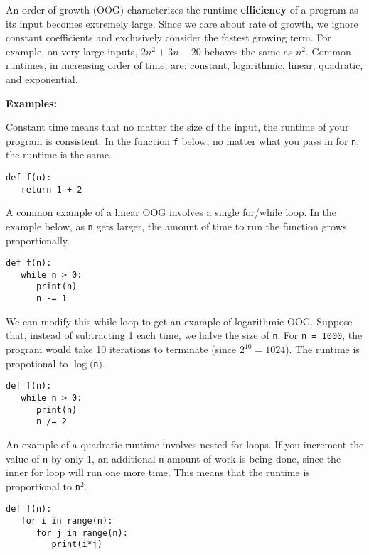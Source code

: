 An order of growth (OOG) characterizes the runtime \textbf{efficiency} of a program as its input becomes extremely large. Since we care about rate of growth, we ignore constant coefficients and exclusively consider the fastest growing term. For example, on very large inputs, $2n^2 + 3n - 20$ behaves the same as $n^2$. Common runtimes, in increasing order of time, are: constant, logarithmic, linear, quadratic, and exponential.

\textbf{Examples:}

Constant time means that no matter the size of the input, the runtime of your program is consistent. In the function \lstinline{f} below, no matter what you pass in for \lstinline{n}, the runtime is the same. \\
\begin{lstlisting}
def f(n):
   return 1 + 2
\end{lstlisting}
A common example of a linear OOG involves a single for/while loop. In the example below, as \lstinline{n} gets larger, the amount of time to run the function grows proportionally. \\
\begin{lstlisting}
def f(n):
   while n > 0:
      print(n)
      n -= 1
\end{lstlisting}
\newpage
We can modify this while loop to get an example of logarithmic OOG. Suppose that, instead of subtracting 1 each time, we halve the size of \lstinline{n}. For \lstinline{n = 1000}, the program would take 10 iterations to terminate (since $2^10 = 1024$). The runtime is propotional to $\log($\lstinline{n}$)$.
\begin{lstlisting}
def f(n):
   while n > 0:
      print(n)
      n /= 2
\end{lstlisting}
An example of a quadratic runtime involves nested for loops. If you increment the value of \lstinline{n} by only 1, an additional \lstinline{n} amount of work is being done, since the inner for loop will run one more time. This means that the runtime is proportional to \lstinline{n}$^{2}$. \\
\begin{lstlisting}
def f(n):
   for i in range(n):
      for j in range(n):
         print(i*j)
\end{lstlisting}

